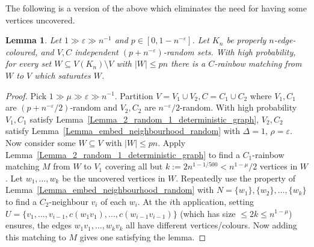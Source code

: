 \documentclass[a4paper,11pt,hidelinks]{amsart}
\newtheorem{lemma}[theorem]{Lemma}
\theoremstyle{definition}
\begin{document}
The following is a version of the above which eliminates the need for having some vertices uncovered.
\begin{lemma}\label{Lemma_random_matching_into_independent_sets}
Let $1\gg \varepsilon \gg n^{-1}$ and $p\in [0,1-n^{-\varepsilon}]$.
Let $K_n$ be properly $n$-edge-coloured, and $V,C$ independent $(p+n^{-\varepsilon})$-random sets. With high probability, for every set $W\subseteq V(K_n)\setminus V$ with $|W|\leq p n$ there is a $C$-rainbow  matching from $W$ to $V$ which saturates $W$.
\end{lemma}
\begin{proof}
Pick $1\gg \mu\gg \varepsilon \gg n^{-1}$.
Partition $V= V_1\cup V_2,C=C_1\cup C_2$ where $V_1, C_1$ are $(p+n^{-\varepsilon}/2)$-random and $V_2, C_2$ are $n^{- \varepsilon}/2$-random.
With high probability $V_1, C_1$ satisfy Lemma~\ref{Lemma_2_random_1_deterministic_graph},  $V_2, C_2$ satisfy Lemma~\ref{Lemma_embed_neighbourhood_random} with $\Delta=1$, $\rho=\varepsilon$. 
Now consider some $W\subseteq V$ with $|W|\leq p n$.
 Apply Lemma~\ref{Lemma_2_random_1_deterministic_graph} to find a $C_1$-rainbow matching $M$ from $W$ to $V_1$ covering all but $k:=2n^{1-1/500}<n^{1-\mu}/2$ vertices in $W$. Let $w_1, \dots, w_k$ be the uncovered vertices in $W$. Repeatedly use the property of Lemma~\ref{Lemma_embed_neighbourhood_random} with $N=\{w_1\}, \{w_2\}, \dots, \{w_k\}$ to find a $C_2$-neighbour $v_i$ of each $w_i$. At the $i$th application, setting $U=\{v_1, \dots, v_{i-1}, c(w_1v_1), \dots, c(w_{i-1}v_{i-1})\}$ (which has size $\leq 2k\leq n^{1-\mu}$) ensures, the edges $w_1v_1, \dots, w_kv_k$ all have different vertices/colours. Now adding this matching to $M$ gives one satisfying the lemma.
\end{proof}
\end{document}
